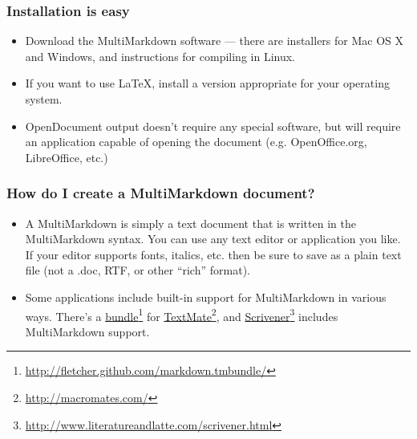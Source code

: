 \begin{frame}

\frametitle{Installation is easy}
\label{installationiseasy}

\begin{itemize}
\item Download the MultiMarkdown software --- there are installers for Mac OS X
 and Windows, and instructions for compiling in Linux.

\item If you want to use LaTeX, install a version appropriate for your operating
 system.

\item OpenDocument output doesn't require any special software, but will require
 an application capable of opening the document (e.g. OpenOffice.org,
 LibreOffice, etc.)

\end{itemize}

\end{frame}

\begin{frame}

\frametitle{How do I create a MultiMarkdown document?}
\label{howdoicreateamultimarkdowndocument}

\begin{itemize}
\item A MultiMarkdown is simply a text document that is written in the
 MultiMarkdown syntax. You can use any text editor or application you like.
 If your editor supports fonts, italics, etc. then be sure to save as a plain
 text file (not a .doc, RTF, or other ``rich'' format).

\item Some applications include built-in support for MultiMarkdown in various
 ways. There's a \href{http://fletcher.github.com/markdown.tmbundle/}{bundle}\footnote{\href{http://fletcher.github.com/markdown.tmbundle/}{http:/\slash fletcher.github.com\slash markdown.tmbundle\slash }} for \href{http://macromates.com/}{TextMate}\footnote{\href{http://macromates.com/}{http:/\slash macromates.com\slash }}, and \href{http://www.literatureandlatte.com/scrivener.html}{Scrivener}\footnote{\href{http://www.literatureandlatte.com/scrivener.html}{http:/\slash www.literatureandlatte.com\slash scrivener.html}} includes
 MultiMarkdown support.

\end{itemize}

\end{frame}

